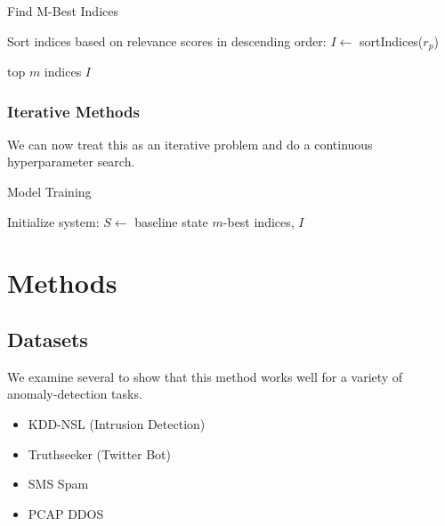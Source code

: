 \documentclass[sigconf]{acmart}
\begin{document}
\begin{algorithm}
  \caption{Find M-Best Indices}
  
  
  
  Sort indices based on relevance scores in descending order: $I \gets$ sortIndices($r_p$)\;
  
  \Return top $m$ indices $I$\;
\end{algorithm}



\subsubsection{Iterative Methods}
We can now treat this as an iterative problem and do a continuous hyperparameter search.



\begin{algorithm}
  \caption{Model Training}
  
  
  Initialize system: $S \gets$ baseline state\;
  \Return $m$-best indices, $I$\;
\end{algorithm}







\section{Methods}

\subsection{Datasets}
We examine several to show that this method works well for a variety of anomaly-detection tasks.
\begin{itemize}
    \item KDD-NSL (Intrusion Detection)
    \item Truthseeker (Twitter Bot)
    \item SMS Spam
    \item PCAP DDOS
\end{itemize}
\end{document}
